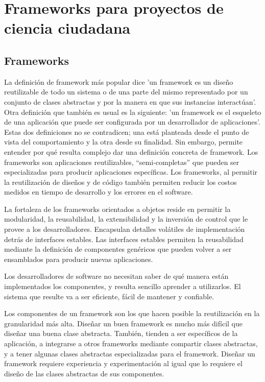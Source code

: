 \chapter{Frameworks para proyectos de ciencia ciudadana}

\section{Frameworks}

	La definición de framework más popular dice 'un framework es un diseño reutilizable de todo un sistema o de una parte del mismo representado por un conjunto de clases abstractas y por la manera en que sus instancias interactúan'. Otra definición que también es usual es la siguiente: 'un framework es el esqueleto de una aplicación que puede ser configurada por un desarrollador de aplicaciones'. Estas dos definiciones no se contradicen; una está planteada desde el punto de vista del comportamiento y la otra desde su finalidad. Sin embargo, permite entender por qué resulta complejo dar una definición concreta de framework. Los frameworks son aplicaciones reutilizables, ``semi-completas'' que pueden ser especializadas para producir aplicaciones específicas. Los frameworks, al permitir la reutilización de diseños y de código también permiten reducir los costos medidos en tiempo de desarrollo y los errores en el software. 
	
	La fortaleza de los frameworks orientados a objetos reside en permitir la modularidad, la reusabilidad, la extensibilidad y la inversión de control que le provee a los desarrolladores. Encapsulan detalles volátiles de implementación detrás de interfaces estables. Las interfaces estables permiten la reusabilidad mediante la definición de componentes genéricos que pueden volver a ser ensamblados para producir nuevas aplicaciones. \cite{fayad1997object}
	
    Los desarrolladores de software no necesitan saber de qué manera están implementados los componentes, y resulta sencillo aprender a utilizarlos. El sistema que resulte va a ser eficiente, fácil de mantener y confiable.\cite{johnson1997frameworks} \cite{fayad1997object}
	
	Los componentes de un framework son los que hacen posible la reutilización en la granularidad más alta. Diseñar un buen framework es mucho más difícil que diseñar una buena clase abstracta. También, tienden a ser específicos de la aplicación, a integrarse a otros frameworks mediante compartir clases abstractas, y a tener algunas clases abstractas especializadas para el framework. Diseñar un framework requiere experiencia y experimentación al igual que lo requiere el diseño de las clases abstractas de sus componentes.\cite{johnson1988designing}

